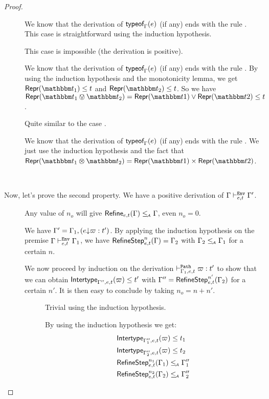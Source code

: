 \documentclass[a4paper]{article}
\theoremstyle{definition}
\begin{document}
\begin{proof}
\begin{description}
    \item[] We know that the derivation of $\textsf{typeof}_{\Gamma}(e)$ (if any) ends with the rule .
    This case is straightforward using the induction hypothesis.
    \item[] This case is impossible (the derivation is positive).
    \item[] We know that the derivation of $\textsf{typeof}_{\Gamma}(e)$ (if any) ends with the rule .
    By using the induction hypothesis and the monotonicity lemma, we get $\tsrep{\ts_1}\leq t$ and $\tsrep{\ts_2}\leq t$.
    So we have $\tsrep{\ts_1\tsor\ts_2}=\tsrep{\ts1}\vee\tsrep{\ts2}\leq t$.
    \item[] Quite similar to the case .
    \item[] We know that the derivation of $\textsf{typeof}_{\Gamma}(e)$ (if any) ends with the rule .
    We just use the induction hypothesis and the fact that $\tsrep{\ts_1\tstimes\ts_2}=\pair {\tsrep{\ts1}} {\tsrep{\ts2}}$.
  \end{description}

  \ 

  Now, let's prove the second property. We have a positive derivation of $\Gamma \vdash^{\texttt{Env}}_{e,t} \Gamma'$.

  \begin{description}
    \item[] Any value of $n_o$ will give $\textsf{Refine}_{e,t}(\Gamma) \leq_{\!\scriptscriptstyle\mathcal{A}} \Gamma$, even $n_o = 0$.
    \item[] We have $\Gamma' = \Gamma_1,(e{\downarrow}\varpi:t')$.
    By applying the induction hypothesis on the premise $\Gamma \vdash^{\texttt{Env}}_{e,t} \Gamma_1$, we have
    $\textsf{RefineStep}_{e,t}^n (\Gamma) = \Gamma_2$ with $\Gamma_2 \leq_{\!\scriptscriptstyle\mathcal{A}} \Gamma_1$ for a certain $n$.

    We now proceed by induction on the derivation $\vdash^{\texttt{Path}}_{\Gamma_1,e,t} \varpi:t'$
    to show that we can obtain $\textsf{Intertype}_{\Gamma'',e,t} (\varpi) \leq t'$ with $\Gamma'' = \textsf{RefineStep}_{e,t}^{n'} (\Gamma_2)$
    for a certain $n'$. It is then easy to conclude by taking $n_o = n+n'$.

    \begin{description}
      \item[] Trivial using the induction hypothesis.
      \item[] By using the induction hypothesis we get:
      \begin{align*}
        &\textsf{Intertype}_{\Gamma_1'',e,t} (\varpi) \leq t_1\\
        &\textsf{Intertype}_{\Gamma_2'',e,t} (\varpi) \leq t_2\\
        &\textsf{RefineStep}_{e,t}^{n_1} (\Gamma_1) \leq_{\!\scriptscriptstyle\mathcal{A}} \Gamma_1''\\
        &\textsf{RefineStep}_{e,t}^{n_2} (\Gamma_2) \leq_{\!\scriptscriptstyle\mathcal{A}} \Gamma_2''
      \end{align*}
      

\end{description}
\end{description}
\end{proof}
\end{document}
